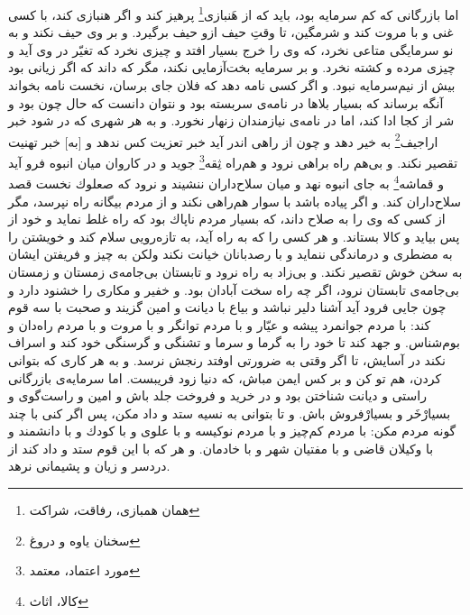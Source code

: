 اما بازرگانى كه كم سرمايه بود، بايد كه از هَنبازى\footnote{همان همبازی، رفاقت، شراکت}  پرهيز كند و اگر هنبازى كند، با كسى غنى و با مروت كند و شرمگين، تا وقتِ حيف ازو حيف برگيرد. و بر وى حيف نكند و به نو سرمايگى متاعى نخرد، كه وى را خرج بسيار افتد و چيزى نخرد كه تغيّر در وى آيد و چيزى مرده و كشته نخرد. و بر سرمايه بخت‌آزمايى نكند، مگر كه داند كه اگر زيانى بود بيش از نيم‌سرمايه نبود. و اگر كسى نامه دهد كه فلان جاى برسان، نخست نامه بخواند آنگه برساند كه بسيار بلاها در نامه‌ی سربسته بود و نتوان دانست كه حال چون بود و شر از كجا ادا كند، اما در نامه‌ی نيازمندان زنهار نخورد. و به هر شهرى كه در شود خبر اراجيف\footnote{سخنان یاوه و دروغ} به خير دهد و چون از راهى اندر آيد خبر تعزيت كس ندهد و [به] خبر تهنيت تقصير نكند. و بى‌هم راه براهى نرود و هم‌راه ثِقه\footnote{مورد اعتماد، معتمد} جويد و در كاروان ميان انبوه فرو آيد و قماشه\footnote{کالا، اثاث}  به جاى انبوه نهد و ميان سلاح‌داران ننشيند و نرود كه صعلوك نخست قصد سلاح‌داران كند. و اگر پياده باشد با سوار هم‌راهى نكند و از مردم بيگانه راه نپرسد، مگر از كسى كه وى را به صلاح داند، كه بسيار مردم ناپاك بود كه راه غلط نمايد و خود از پس بيايد و كالا بستاند. و هر كسى را كه به راه آيد، به تازه‌رويى سلام كند و خويشتن را به مضطرى و درماندگى ننمايد و با رصدبانان خيانت نكند ولكن به چيز و فريفتن ايشان به سخن خوش تقصير نكند. و بى‌زاد به راه نرود و تابستان بى‌جامه‌ی زمستان و زمستان بى‌جامه‌ی تابستان نرود، اگر چه راه سخت آبادان بود. و خفير و مكارى را خشنود دارد و چون جايى فرود آيد آشنا دلير نباشد و بياع با ديانت و امين گزيند و صحبت با سه قوم كند: با مردم جوانمرد پيشه و عيّار و با مردم توانگر و با مروت و با مردم راه‌دان و بوم‌شناس. و جهد كند تا خود را به گرما و سرما و تشنگى و گرسنگى خود كند و اسراف نكند در آسايش، تا اگر وقتى به ضرورتى اوفتد رنجش نرسد. و به هر كارى كه بتوانى كردن، هم تو كن و بر كس ايمن مباش، كه دنيا زود فريبست. اما سرمايه‌ی بازرگانى راستى و ديانت شناختن بود و در خريد و فروخت جلد باش و امين و راست‌گوى و بسيارْخَر و بسيارْفروش باش. و تا بتوانى به نسيه ستد و داد مكن، پس اگر كنى با چند گونه مردم مكن: با مردم كم‌چيز و با مردم نو‌كيسه و با علوى و با كودك و با دانشمند و با وكيلان قاضى و با مفتيان شهر و با خادمان. و هر كه با اين قوم ستد و داد كند از دردسر و زيان و پشيمانى نرهد.

